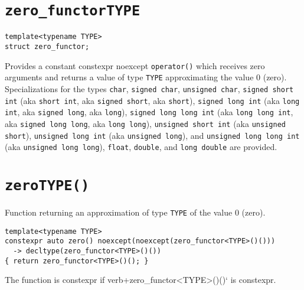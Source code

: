 \section{\texttt{zero\_functor\textlangle TYPE\textrangle}}
\begin{verbatim}
template<typename TYPE>
struct zero_functor;
\end{verbatim}
Provides a constant constexpr noexcept \texttt{operator()} which receives zero arguments and returns a
value of type \texttt{TYPE} approximating the value $0$ (zero).
Specializations for the types
\texttt{char},
\texttt{signed char},
\texttt{unsigned char},
\texttt{signed short int}       (aka \texttt{short int},     aka \texttt{signed short},     aka \texttt{short}),
\texttt{signed long int}        (aka \texttt{long int},      aka \texttt{signed long},      aka \texttt{long}),
\texttt{signed long long int}   (aka \texttt{long long int}, aka \texttt{signed long long}, aka \texttt{long long}),
\texttt{unsigned short int}     (aka \texttt{unsigned short}),
\texttt{unsigned long int}      (aka \texttt{unsigned long}), and
\texttt{unsigned long long int} (aka \texttt{unsigned long long}),
\texttt{float},
\texttt{double}, and
\texttt{long double}
are provided.

\section{\texttt{zero\textlangle TYPE\textrangle()}}
Function returning an approximation of type \texttt{TYPE} of the value $0$ (zero).
\begin{verbatim}
template<typename TYPE>
constexpr auto zero() noexcept(noexcept(zero_functor<TYPE>()()))
  -> decltype(zero_functor<TYPE>()())
{ return zero_functor<TYPE>()(); }
\end{verbatim}
The function is constexpr if verb+zero_functor<TYPE>()()` is constexpr.
